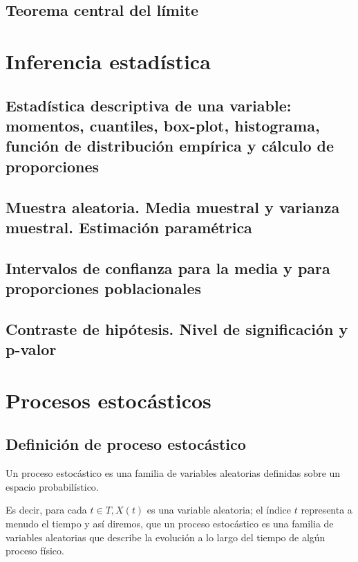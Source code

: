 \documentclass[a4paper]{book}
\begin{document}
\section{Teorema central del límite}




\chapter{Inferencia estadística}


\section{Estadística descriptiva de una variable: momentos, cuantiles, box-plot, histograma, función de distribución empírica y cálculo de proporciones}

\section{Muestra aleatoria. Media muestral y varianza muestral. Estimación paramétrica}

\section{Intervalos de confianza para la media y para proporciones poblacionales}

\section{Contraste de hipótesis. Nivel de significación y p-valor}



\chapter{Procesos estocásticos}

\section{Definición de proceso estocástico}
Un proceso estocástico es una familia de variables aleatorias definidas sobre un espacio probabilístico.

Es decir, para cada $ t\in T, X(t)$ es una variable aleatoria; el índice $t$ representa a menudo el tiempo y así diremos, que un proceso estocástico es una familia de variables aleatorias que describe la evolución a lo largo del tiempo de algún proceso físico.
\end{document}
